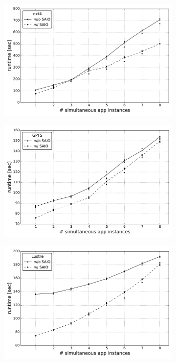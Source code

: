 \begin{figure}[]
  \centering
  \begin{subfigure}[]{0.70\textwidth}
    \centering
    \includegraphics[width=\textwidth]{figures/simult_instance_ext4_test_cluster}
    \caption{\textit{}}
    \label{figure: ext4_2}
  \end{subfigure}
  \begin{subfigure}[]{0.70\textwidth}
    \centering
    \includegraphics[width=\textwidth]{figures/simult_instance_gpfs_test_cluster}
    \caption{\textit{}}
    \label{figure: gpfs_2}
  \end{subfigure}
  \begin{subfigure}[]{0.70\textwidth}
    \centering
    \includegraphics[width=\textwidth]{figures/multiple_simult_procs_Lustre_testcluster}

\end{subfigure}
\end{figure}

